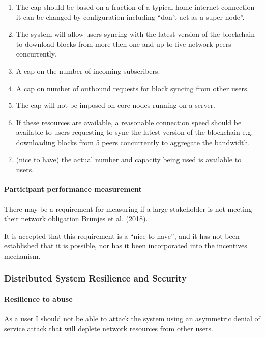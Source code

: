 \documentclass[11pt,a4paper]{article}
\begin{document}
\begin{enumerate}
\item
  The cap should be based on a fraction of a typical home internet
  connection -- it can be changed by configuration including ``don't act
  as a super node''.
\item
  The system will allow users syncing with the latest version of the
  blockchain to download blocks from more then one and up to five
  network peers concurrently.
\item
  A cap on the number of incoming subscribers.
\item
  A cap on number of outbound requests for block syncing from other
  users.
\item
  The cap will not be imposed on core nodes running on a server.
\item
  If these resources are available, a reasonable connection speed should
  be available to users requesting to sync the latest version of the
  blockchain e.g. downloading blocks from 5 peers concurrently to
  aggregate the bandwidth.
\item
  (nice to have) the actual number and capacity being used is available
  to users.
\end{enumerate}

\paragraph{Participant performance measurement}

There may be a requirement for measuring if a large stakeholder is not
meeting their network obligation Br\"unjes et al. (2018).

It is accepted that this requirement is a ``nice to have'', and it has
not been established that it is possible, nor has it been incorporated
into the incentives mechanism.

\subsubsection{Distributed System Resilience and Security}
\label{distributed-system-resilience-and-security}

\paragraph{Resilience to abuse}

As a user I should not be able to attack the system using an asymmetric
denial of service attack that will deplete network resources from other
users.
\end{document}

